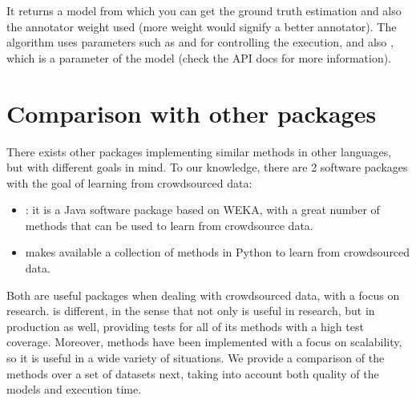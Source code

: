 \documentclass[letterpaper,10pt,english]{sphinxmanual}
\begin{document}
It returns a model from which you can get the ground truth estimation and
also the annotator weight used (more weight would signify a better annotator).
The algorithm uses parameters such as  and  for
controlling the execution, and also , which is a parameter of the model
(check the API docs for more information).


\chapter{Comparison with other packages}
\label{\detokenize{package/other:comparison-with-other-packages}}\label{\detokenize{package/other::doc}}
There exists other packages implementing similar methods in other languages, but with
different goals in mind. To our knowledge, there are 2 software packages with the goal
of learning from crowdsourced data:
\begin{itemize}
\item {} 
: it is a Java software package based on WEKA, with
a great number of methods that can be used to learn from crowdsource data.

\item {} 
 makes available a collection
of methods in Python to learn from crowdsourced data.

\end{itemize}

Both are useful packages when dealing with crowdsourced data, with a focus on research.  is different, in the sense that
not only is useful in research, but in production as well, providing tests for all of its methods with a high test coverage. Moreover,
methods have been implemented with a focus on scalability, so it is useful in a wide variety of situations. We provide a
comparison of the methods over a set of datasets next, taking into account both quality of the models and execution time.
\end{document}

